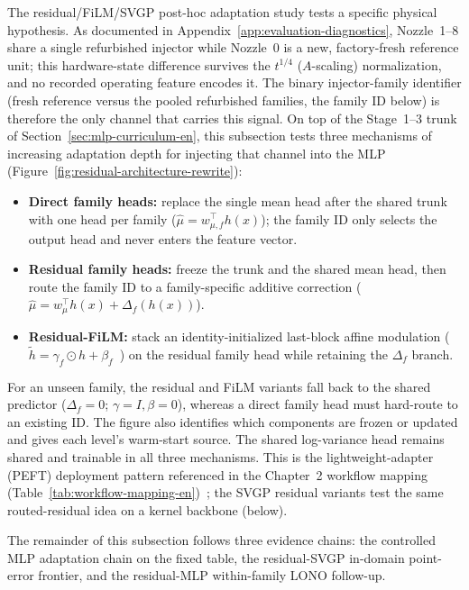 The residual/FiLM/SVGP post-hoc adaptation study tests a specific physical
hypothesis. As documented in Appendix~\ref{app:evaluation-diagnostics},
Nozzle~1--8 share a single refurbished injector while Nozzle~0 is a new,
factory-fresh reference unit; this hardware-state difference survives the
\(t^{1/4}\) (\(A\)-scaling) normalization, and no recorded operating feature
encodes it. The binary injector-family identifier (fresh reference versus the
pooled refurbished families, the family ID below) is therefore the only
channel that carries this signal. On top of the Stage~1--3 trunk of
Section~\ref{sec:mlp-curriculum-en}, this subsection tests three mechanisms of
increasing adaptation depth for injecting that channel into the MLP
(Figure~\ref{fig:residual-architecture-rewrite}):
\begin{itemize}
  \item \textbf{Direct family heads:} replace the single mean head after the shared trunk with one head per family
  (\(\hat\mu = w_{\mu,f}^{\top} h(x)\)); the family ID only selects the output head and never enters the feature vector.
  \item \textbf{Residual family heads:} freeze the trunk and the shared mean head, then route the family ID to a
  family-specific additive correction (\(\hat\mu = w_{\mu}^{\top} h(x) + \Delta_f(h(x))\)).
  \item \textbf{Residual-FiLM:} stack an identity-initialized last-block affine modulation
  (\(\tilde h = \gamma_f \odot h + \beta_f\)~\cite{Perez2018FiLM}) on the residual family head while retaining the
  \(\Delta_f\) branch.
\end{itemize}
For an unseen family, the residual and FiLM variants fall back to the shared
predictor (\(\Delta_f=0\); \(\gamma=I,\beta=0\)), whereas a direct family head
must hard-route to an existing ID. The figure also identifies which components
are frozen or updated and gives each level's warm-start source. The shared
log-variance head remains shared and trainable in all three mechanisms. This is
the lightweight-adapter (PEFT) deployment pattern referenced in the Chapter~2
workflow mapping (Table~\ref{tab:workflow-mapping-en})~\cite{Han2024PEFT}; the
SVGP residual variants test the same routed-residual idea on a kernel backbone
(below).

The remainder of this subsection follows three evidence chains: the controlled
MLP adaptation chain on the fixed table, the residual-SVGP in-domain
point-error frontier, and the residual-MLP within-family LONO follow-up.

